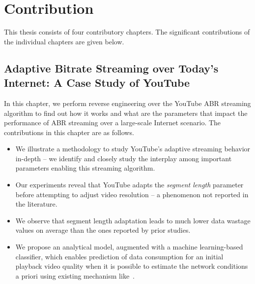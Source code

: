 \section{Contribution}
This thesis consists of four contributory chapters. The significant contributions of the individual chapters are given below. 

\subsection{Adaptive Bitrate Streaming over Today's Internet: A Case Study of YouTube}
In this chapter, we perform reverse engineering over the YouTube ABR streaming algorithm to find out how it works and what are the parameters that impact the performance of ABR streaming over a large-scale Internet scenario. The contributions in this chapter are as follows. 
\begin{itemize}
	\item We illustrate a methodology to study YouTube's adaptive streaming behavior in-depth -- we identify and closely study the interplay among important parameters enabling this streaming algorithm.
	\item Our experiments reveal that YouTube adapts the {\it segment length} parameter before attempting to adjust video resolution -- a phenomenon not reported in the literature.
	\item We observe that segment length adaptation leads to much lower data wastage values on average than the ones reported by prior studies.
	\item We propose an analytical model, augmented with a machine learning-based classifier, which enables prediction of data consumption for an initial playback video quality when it is possible to estimate the network conditions a priori using existing mechanism like~\cite{Zou2015}.
\end{itemize}


